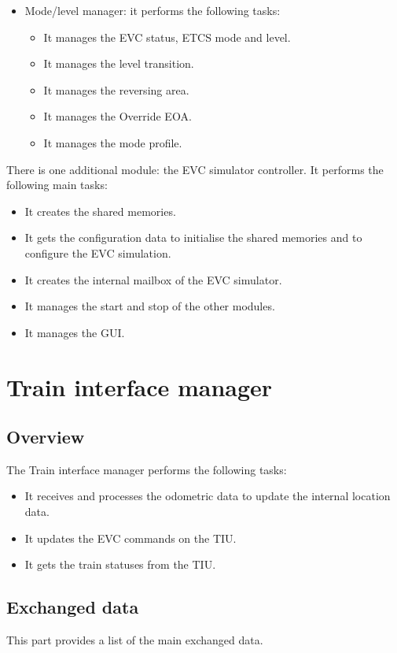 \documentclass[nocc]{template/openetcs_report}
\begin{document}
\begin{itemize}
\begin{itemize}
	\end{itemize}
\item	Mode/level manager: it performs the following tasks:
	\begin{itemize}
	\item	It manages the EVC status, ETCS mode and level.
	\item	It manages the level transition.
	\item	It manages the reversing area.
	\item	It manages the Override EOA.
	\item	It manages the mode profile.
	\end{itemize}
\end{itemize}

There is one additional module: the EVC simulator controller. It performs the following main tasks:
\begin{itemize}
\item It creates the shared memories.
\item It gets the configuration data to initialise the shared memories and to configure the EVC simulation.
\item It creates the internal mailbox of the EVC simulator.
\item It manages the start and stop of the other modules.
\item It manages the GUI.
\end{itemize}
\chapter{Train interface manager}
\section{Overview}
The Train interface manager performs the following tasks:
\begin{itemize}
\item	It receives and processes the odometric data to update the internal location data.
\item		It updates the EVC commands on the TIU.
\item		It gets the train statuses from the TIU.
\end{itemize}
\section{Exchanged data}
This part provides a list of the main exchanged data. 
\end{document}

